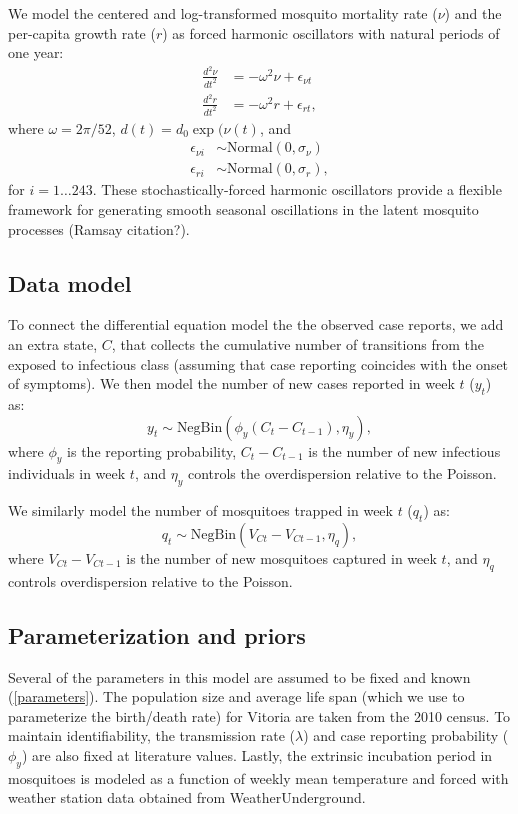 \documentclass[10pt,letterpaper]{article}
\begin{document}
We model the centered and log-transformed mosquito mortality rate ($\nu$) and the per-capita growth rate ($r$) as forced harmonic oscillators with natural periods of one year:
\begin{align}
\frac{d^2\nu}{dt^2} &= -\omega^2 \nu + \epsilon_{\nu t}\\
\frac{d^2 r}{dt^2} &= -\omega^2 r + \epsilon_{rt},
\end{align}
where $\omega = 2\pi / 52$, $d(t) = d_0 \exp(\nu(t)$, and
\begin{align}
\epsilon_{\nu i} & \sim \text{Normal}(0, \sigma_{\nu})\\
\epsilon_{ri} & \sim \text{Normal}(0, \sigma_r),
\end{align}
for $i = 1 \dots 243$.
These stochastically-forced harmonic oscillators provide a flexible framework for generating smooth seasonal oscillations in the latent mosquito processes (Ramsay citation?).

\subsection*{Data model}

To connect the differential equation model the the observed case reports, we add an extra state, $C$, that collects the cumulative number of transitions from the exposed to infectious class (assuming that case reporting coincides with the onset of symptoms).
We then model the number of new cases reported in week $t$ ($y_t$) as:
\begin{equation}
y_t  \sim \text{NegBin}(\phi_y (C_t - C_{t-1}), \eta_y),
\end{equation}
where $\phi_y$ is the reporting probability, $C_t - C_{t-1}$ is the number of new infectious individuals in week $t$, and $\eta_y$ controls the overdispersion relative to the Poisson.

We similarly model the number of mosquitoes trapped in week $t$ ($q_t$) as:
\begin{equation}
q_t \sim \text{NegBin}(V_{Ct} - V_{Ct-1}, \eta_q),
\end{equation}
where $V_{Ct} - V_{Ct-1}$ is the number of new mosquitoes captured in week $t$, and $\eta_q$ controls overdispersion relative to the Poisson.

\subsection*{Parameterization and priors}

Several of the parameters in this model are assumed to be fixed and known (\ref{parameters}).
The population size and average life span (which we use to parameterize the birth/death rate) for Vitoria are taken from the 2010 census.
To maintain identifiability, the transmission rate ($\lambda$) and case reporting probability ($\phi_y$) are also fixed at literature values.
Lastly, the extrinsic incubation period in mosquitoes is modeled as a function of weekly mean temperature and forced with weather station data obtained from WeatherUnderground.
\end{document}
